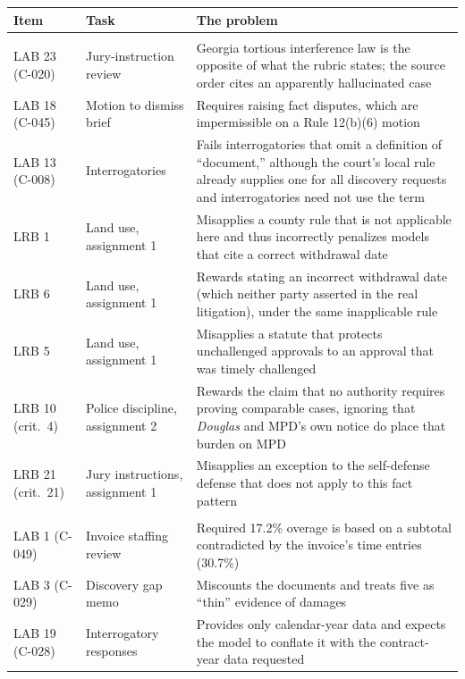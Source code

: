 \documentclass[11pt]{article}
\begin{document}
\begin{table}[htbp]
\centering
{\footnotesize
\begin{tabular}{@{}>{\raggedright\arraybackslash}p{.16\linewidth}>{\raggedright\arraybackslash}p{.19\linewidth}>{\raggedright\arraybackslash}p{.59\linewidth}@{}}
\toprule
Item & Task & The problem\\
\midrule
\multicolumn{3}{@{}l}{\textit{Errors of law}}\\
LAB 23 (C-020) & Jury-instruction review & Georgia tortious interference law is the opposite of what the rubric states; the source order cites an apparently hallucinated case\\
LAB 18 (C-045) & Motion to dismiss brief & Requires raising fact disputes, which are impermissible on a Rule 12(b)(6) motion\\
LAB 13 (C-008) & Interrogatories & Fails interrogatories that omit a definition of ``document,'' although the court's local rule already supplies one for all discovery requests and interrogatories need not use the term\\
LRB 1 & Land use, assignment 1 & Misapplies a county rule that is not applicable here and thus incorrectly penalizes models that cite a correct withdrawal date\\
LRB 6 & Land use, assignment 1 & Rewards stating an incorrect withdrawal date (which neither party asserted in the real litigation), under the same inapplicable rule\\
LRB 5 & Land use, assignment 1 & Misapplies a statute that protects unchallenged approvals to an approval that was timely challenged\\
LRB 10 (crit.\ 4) & Police discipline, assignment 2 & Rewards the claim that no authority requires proving comparable cases, ignoring that \emph{Douglas} and MPD's own notice do place that burden on MPD\\
LRB 21 (crit.\ 21) & Jury instructions, assignment 1 & Misapplies an exception to the self-defense defense that does not apply to this fact pattern\\
\addlinespace
\multicolumn{3}{@{}l}{\textit{Errors of fact and arithmetic}}\\
LAB 1 (C-049) & Invoice staffing review & Required 17.2\% overage is based on a subtotal contradicted by the invoice's time entries (30.7\%)\\
LAB 3 (C-029) & Discovery gap memo & Miscounts the documents and treats five as ``thin'' evidence of damages\\
LAB 19 (C-028) & Interrogatory responses & Provides only calendar-year data and expects the model to conflate it with the contract-year data requested\\

\end{tabular}}
\end{table}
\end{document}
